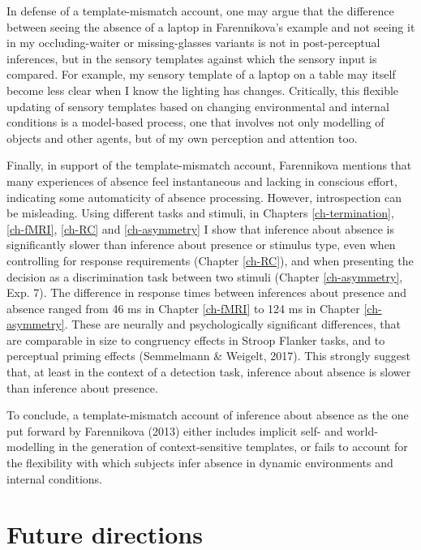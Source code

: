 \documentclass[12pt,twoside]{reedthesis}
\begin{document}
In defense of a template-mismatch account, one may argue that the difference between seeing the absence of a laptop in Farennikova's example and not seeing it in my occluding-waiter or missing-glasses variants is not in post-perceptual inferences, but in the sensory templates against which the sensory input is compared. For example, my sensory template of a laptop on a table may itself become less clear when I know the lighting has changes. Critically, this flexible updating of sensory templates based on changing environmental and internal conditions is a model-based process, one that involves not only modelling of objects and other agents, but of my own perception and attention too.

Finally, in support of the template-mismatch account, Farennikova mentions that many experiences of absence feel instantaneous and lacking in conscious effort, indicating some automaticity of absence processing. However, introspection can be misleading. Using different tasks and stimuli, in Chapters \ref{ch-termination}, \ref{ch-fMRI}, \ref{ch-RC} and \ref{ch-asymmetry} I show that inference about absence is significantly slower than inference about presence or stimulus type, even when controlling for response requirements (Chapter \ref{ch-RC}), and when presenting the decision as a discrimination task between two stimuli (Chapter \ref{ch-asymmetry}, Exp. 7). The difference in response times between inferences about presence and absence ranged from 46 ms in Chapter \ref{ch-fMRI} to 124 ms in Chapter \ref{ch-asymmetry}. These are neurally and psychologically significant differences, that are comparable in size to congruency effects in Stroop Flanker tasks, and to perceptual priming effects (Semmelmann \& Weigelt, 2017). This strongly suggest that, at least in the context of a detection task, inference about absence is slower than inference about presence.

To conclude, a template-mismatch account of inference about absence as the one put forward by Farennikova (2013) either includes implicit self- and world-modelling in the generation of context-sensitive templates, or fails to account for the flexibility with which subjects infer absence in dynamic environments and internal conditions.

\hypertarget{future-directions}{%
\section*{Future directions}\label{future-directions}}
\end{document}
